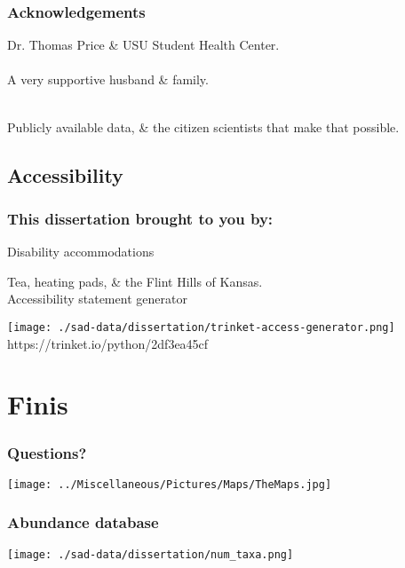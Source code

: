 \documentclass[14pt]{beamer}
\begin{document}
\begin{frame}[t]{}
\frametitle{Acknowledgements}
Dr. Thomas Price \& USU Student Health Center.\\
~\\
A very supportive husband \& family.\\
~\\
\begin{Large}
Publicly available data, \& the citizen scientists that make that possible.\\
\end{Large}
\end{frame}

\subsection{Accessibility}
\begin{frame}[t]{}
\frametitle{This dissertation brought to you by:}
\begin{large}
Disability accommodations\\
\end{large}
Tea, heating pads, \& the Flint Hills of Kansas.\\
Accessibility statement generator
\begin{center}
\texttt{[image: ./sad-data/dissertation/trinket-access-generator.png]}\\
https://trinket.io/python/2df3ea45cf
\end{center}
\end{frame}

\section{Finis}
\begin{frame}[t]
\frametitle{Questions?}
\begin{center}
\texttt{[image: ../Miscellaneous/Pictures/Maps/TheMaps.jpg]}
\end{center}
\end{frame}

\begin{frame}{}
\frametitle{Abundance database}
\texttt{[image: ./sad-data/dissertation/num\_taxa.png]}
\end{frame}
\end{document}
